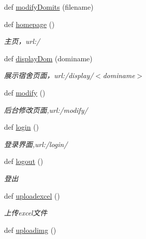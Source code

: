 \begin{DoxyCompactItemize}
def \mbox{\hyperlink{namespacemain_a8da19f25dec98a742cf10ab27b83bf73}{modify\+Domits}} (filename)
\item 
def \mbox{\hyperlink{group___xE8_xB7_xAF_xE7_x94_xB1_xE5_x87_xBD_xE6_x95_xB0_gab78667d84f4fdf0575af2adb306417c4}{homepage}} ()
\begin{DoxyCompactList}\small\item\em 主页，url\+:\textquotesingle{}/\textquotesingle{} \end{DoxyCompactList}\item 
def \mbox{\hyperlink{group___xE8_xB7_xAF_xE7_x94_xB1_xE5_x87_xBD_xE6_x95_xB0_ga037a19c20276c539ad0c761b8d54e36f}{display\+Dom}} (dominame)
\begin{DoxyCompactList}\small\item\em 展示宿舍页面，url\+:\textquotesingle{}/display/$<$dominame$>$\textquotesingle{} \end{DoxyCompactList}\item 
def \mbox{\hyperlink{group___xE8_xB7_xAF_xE7_x94_xB1_xE5_x87_xBD_xE6_x95_xB0_gac7ef9122c03a3279b6d1d904f4a16150}{modify}} ()
\begin{DoxyCompactList}\small\item\em 后台修改页面,url\+:\textquotesingle{}/modify/\textquotesingle{} \end{DoxyCompactList}\item 
def \mbox{\hyperlink{group___xE8_xB7_xAF_xE7_x94_xB1_xE5_x87_xBD_xE6_x95_xB0_ga4a5118733a16e40bc747937152312ab0}{login}} ()
\begin{DoxyCompactList}\small\item\em 登录界面,url\+:\textquotesingle{}/login/\textquotesingle{} \end{DoxyCompactList}\item 
def \mbox{\hyperlink{group___xE8_xB7_xAF_xE7_x94_xB1_xE5_x87_xBD_xE6_x95_xB0_ga6065500a38cb05f19a9613bdc7ac05f1}{logout}} ()
\begin{DoxyCompactList}\small\item\em 登出 \end{DoxyCompactList}\item 
def \mbox{\hyperlink{group___xE8_xB7_xAF_xE7_x94_xB1_xE5_x87_xBD_xE6_x95_xB0_gadc4862ff2e8d5f1dee064a0b2f9f3dc9}{uploadexcel}} ()
\begin{DoxyCompactList}\small\item\em 上传excel文件 \end{DoxyCompactList}\item 
def \mbox{\hyperlink{group___xE8_xB7_xAF_xE7_x94_xB1_xE5_x87_xBD_xE6_x95_xB0_gad28764d44d01ada36ff0dfbbcac903d5}{uploadimg}} ()

\end{DoxyCompactItemize}
